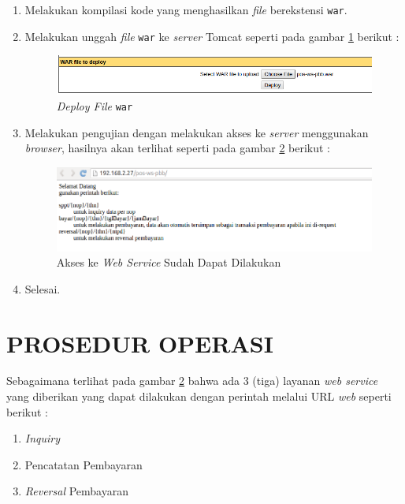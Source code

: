 \documentclass[pdftex,12pt, oneside]{article}
\begin{document}
\begin{enumerate}[1.]
  \item Melakukan kompilasi kode yang menghasilkan \textit{file} berekstensi \texttt{war}.
  
  \item Melakukan unggah \textit{file} \texttt{war} ke \textit{server} Tomcat seperti pada gambar \ref{fig:deploy-war} berikut :
  
  \begin{figure}[H]
    \centering
    \includegraphics[width=1\textwidth]{./resources/001-deploy-war}
    \caption{\textit{Deploy File} \texttt{war}}
    \label{fig:deploy-war}
  \end{figure}
  
  \item Melakukan pengujian dengan melakukan akses ke \textit{server} menggunakan \textit{browser}, hasilnya akan terlihat seperti pada gambar \ref{fig:ws-worked} berikut :
  
  \begin{figure}[H]
    \centering
    \includegraphics[width=1\textwidth]{./resources/002-ws-worked}
    \caption{Akses ke \textit{Web Service} Sudah Dapat Dilakukan}
    \label{fig:ws-worked}
  \end{figure}
  
  \item Selesai.
\end{enumerate}

\section{PROSEDUR OPERASI}

Sebagaimana terlihat pada gambar \ref{fig:ws-worked} bahwa ada 3 (tiga) layanan \textit{web service} yang diberikan yang dapat dilakukan dengan perintah melalui URL \textit{web} seperti berikut :

\begin{enumerate}[1.]
  \item \textit{Inquiry}
  \item Pencatatan Pembayaran
  \item \textit{Reversal} Pembayaran
\end{enumerate}
\end{document}

